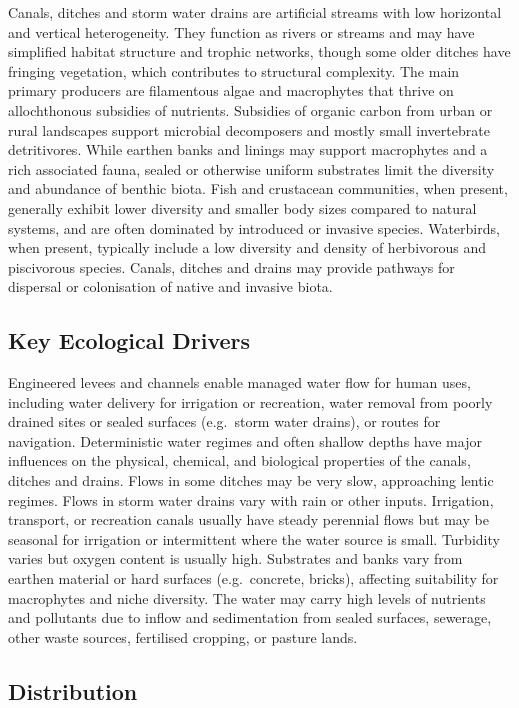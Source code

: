 \documentclass[
  letterpaper,
  DIV=11,
  numbers=noendperiod]{scrartcl}
\begin{document}
Canals, ditches and storm water drains are artificial streams with low
horizontal and vertical heterogeneity. They function as rivers or
streams and may have simplified habitat structure and trophic networks,
though some older ditches have fringing vegetation, which contributes to
structural complexity. The main primary producers are filamentous algae
and macrophytes that thrive on allochthonous subsidies of nutrients.
Subsidies of organic carbon from urban or rural landscapes support
microbial decomposers and mostly small invertebrate detritivores. While
earthen banks and linings may support macrophytes and a rich associated
fauna, sealed or otherwise uniform substrates limit the diversity and
abundance of benthic biota. Fish and crustacean communities, when
present, generally exhibit lower diversity and smaller body sizes
compared to natural systems, and are often dominated by introduced or
invasive species. Waterbirds, when present, typically include a low
diversity and density of herbivorous and piscivorous species. Canals,
ditches and drains may provide pathways for dispersal or colonisation of
native and invasive biota.

\subsection{Key Ecological Drivers}\label{key-ecological-drivers-130}

Engineered levees and channels enable managed water flow for human uses,
including water delivery for irrigation or recreation, water removal
from poorly drained sites or sealed surfaces (e.g.~storm water drains),
or routes for navigation. Deterministic water regimes and often shallow
depths have major influences on the physical, chemical, and biological
properties of the canals, ditches and drains. Flows in some ditches may
be very slow, approaching lentic regimes. Flows in storm water drains
vary with rain or other inputs. Irrigation, transport, or recreation
canals usually have steady perennial flows but may be seasonal for
irrigation or intermittent where the water source is small. Turbidity
varies but oxygen content is usually high. Substrates and banks vary
from earthen material or hard surfaces (e.g.~concrete, bricks),
affecting suitability for macrophytes and niche diversity. The water may
carry high levels of nutrients and pollutants due to inflow and
sedimentation from sealed surfaces, sewerage, other waste sources,
fertilised cropping, or pasture lands.

\subsection{Distribution}\label{distribution-130}
\end{document}
